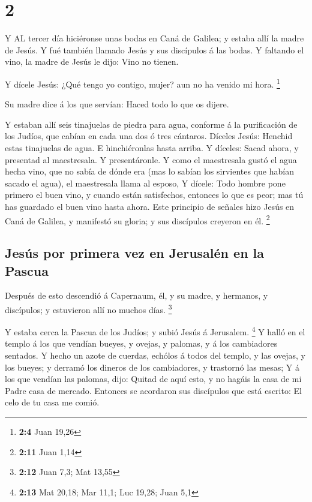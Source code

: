 \hypertarget{section-1}{%
\section{2}\label{section-1}}

 Y AL tercer día hiciéronse unas bodas en Caná de Galilea; y
estaba allí la madre de Jesús.  Y fué también llamado Jesús
y sus discípulos á las bodas.  Y faltando el vino, la madre
de Jesús le dijo: Vino no tienen.

 Y dícele Jesús: ¿Qué tengo yo contigo, mujer? aun no ha
venido mi hora. \footnote{\textbf{2:4} Juan 19,26}

 Su madre dice á los que servían: Haced todo lo que os
dijere.

 Y estaban allí seis tinajuelas de piedra para agua,
conforme á la purificación de los Judíos, que cabían en cada una dos ó
tres cántaros.  Díceles Jesús: Henchid estas tinajuelas de
agua. E hinchiéronlas hasta arriba.  Y díceles: Sacad ahora,
y presentad al maestresala. Y presentáronle.  Y como el
maestresala gustó el agua hecha vino, que no sabía de dónde era (mas lo
sabían los sirvientes que habían sacado el agua), el maestresala llama
al esposo,  Y dícele: Todo hombre pone primero el buen
vino, y cuando están satisfechos, entonces lo que es peor; mas tú has
guardado el buen vino hasta ahora.  Este principio de
señales hizo Jesús en Caná de Galilea, y manifestó su gloria; y sus
discípulos creyeron en él. \footnote{\textbf{2:11} Juan 1,14}

\hypertarget{jesuxfas-por-primera-vez-en-jerusaluxe9n-en-la-pascua}{%
\subsection{Jesús por primera vez en Jerusalén en la
Pascua}\label{jesuxfas-por-primera-vez-en-jerusaluxe9n-en-la-pascua}}

 Después de esto descendió á Capernaum, él, y su madre, y
hermanos, y discípulos; y estuvieron allí no muchos días. \footnote{\textbf{2:12}
  Juan 7,3; Mat 13,55}

 Y estaba cerca la Pascua de los Judíos; y subió Jesús á
Jerusalem. \footnote{\textbf{2:13} Mat 20,18; Mar 11,1; Luc 19,28; Juan
  5,1}  Y halló en el templo á los que vendían bueyes, y
ovejas, y palomas, y á los cambiadores sentados.  Y hecho
un azote de cuerdas, echólos á todos del templo, y las ovejas, y los
bueyes; y derramó los dineros de los cambiadores, y trastornó las mesas;
 Y á los que vendían las palomas, dijo: Quitad de aquí
esto, y no hagáis la casa de mi Padre casa de mercado. 
Entonces se acordaron sus discípulos que está escrito: El celo de tu
casa me comió.

